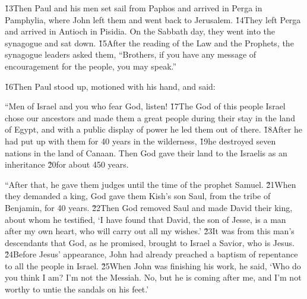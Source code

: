 \v{13}Then Paul and his men set sail from Paphos and arrived in Perga in Pamphylia, where John left them and went back to Jerusalem. \v{14}They left Perga and arrived in Antioch in Pisidia. On the Sabbath day, they went into the synagogue and sat down. \v{15}After the reading of the Law and the Prophets, the synagogue leaders asked them, ``Brothers, if you have any message of encouragement for the people, you may speak.''

\v{16}Then Paul stood up, motioned with his hand, and said:

``Men of Israel and you who fear God, listen! \v{17}The God of this people Israel chose our ancestors and made them a great people during their stay in the land of Egypt, and with a public display of power he led them out of there. \v{18}After he had put up with them for 40 years in the wilderness, \v{19}he destroyed seven nations in the land of Canaan. Then God gave their land to the Israelis as an inheritance \v{20}for about 450 years.

``After that, he gave them judges until the time of the prophet Samuel. \v{21}When they demanded a king, God gave them Kish's son Saul, from the tribe of Benjamin, for 40 years. \v{22}Then God removed Saul and made David their king, about whom he testified, `I have found that David, the son of Jesse, is a man after my own heart, who will carry out all my wishes.' \v{23}It was from this man's descendants that God, as he promised, brought to Israel a Savior, who is Jesus. \v{24}Before Jesus' appearance, John had already preached a baptism of repentance to all the people in Israel. \v{25}When John was finishing his work, he said, `Who do you think I am? I'm not the Messiah. No, but he is coming after me, and I'm not worthy to untie the sandals on his feet.'

